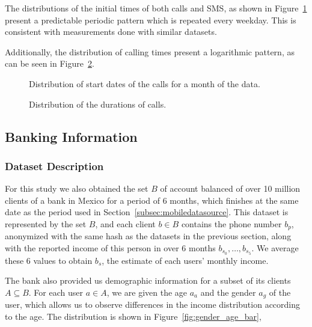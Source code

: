 The distributions of the initial times of both calls and SMS, as shown in Figure~\ref{fig:callsmsstartdatetime} present a predictable periodic pattern which is repeated every weekday. This is consistent with measurements done with similar datasets.

Additionally, the distribution of calling times present a logarithmic pattern, as can be seen in Figure~\ref{fig:callduration}.

\begin{figure}
\centering
{}
\caption{Distribution of start dates of the calls for a month of the data.}
\label{fig:callsmsstartdatetime}
\end{figure}

\begin{figure}
\centering
{}
\caption{Distribution of the durations of calls.}
\label{fig:callduration}
\end{figure}

\subsection{Banking Information}
\label{subsec:bank_source}

\subsubsection{Dataset Description}

For this study we also obtained the set $B$ of account balanced of over 10 million clients of a bank in Mexico for a period of 6 months, which finishes at the same date as the period used in Section~\ref{subsec:mobiledatasource}. This dataset is represented by the set $B$, and each client $b \in B$ contains the phone number $b_p$, anonymized with the same hash as the datasets in the previous section, along with the reported income of this person in over 6 months $b_{s_0}, \ldots, b_{s_5}$. We average these 6 values to obtain $b_s$, the estimate of each users' monthly income.

The bank also provided us demographic information for a subset of its clients $A \subseteq B$. For each user $a \in A$, we are given the age $a_a$ and the gender $a_g$ of the user, which allows us to observe differences in the income distribution according to the age. The distribution is shown in Figure~\ref{fig:gender_age_bar}, 

